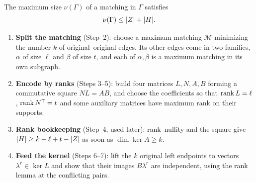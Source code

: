 \begin{lemma}\label{lem:matching}
The maximum size $\nu(\Gamma)$ of a matching in $\Gamma$ satisfies
\[
 \nu(\Gamma)\le \lvert Z\rvert+\lvert H\rvert .
\]
\end{lemma}


\begin{planbox}
\begin{enumerate}[leftmargin=1.3em,itemsep=1pt,topsep=1pt]
\item \textbf{Split the matching} (Step~2): choose a maximum matching $\mathcal M$ minimizing the
 number $k$ of original--original edges. Its other edges come in two families, $\alpha$ of size
 $\ell$ and $\beta$ of size $t$, and each of $\alpha,\beta$ is a maximum matching in its own
 subgraph.
\item \textbf{Encode by ranks} (Steps 3--5): build four matrices $L,N,A,B$ forming a commutative
 square $NL=AB$, and choose the coefficients so that $\operatorname{rank} L=\ell$, $\operatorname{rank} N^{\mathsf T}=t$ and
 some auxiliary matrices have maximum rank on their supports.
\item \textbf{Rank bookkeeping} (Step~4, used later): rank--nullity and the square give
 $\lvert H\rvert\ge k+\ell+t-\lvert Z\rvert$ as soon as $\dim\ker A\ge k$.
\item \textbf{Feed the kernel} (Steps 6--7): lift the $k$ original left endpoints to vectors
 $\lambda^r\in\ker L$ and show that their images $B\lambda^r$ are independent, using the rank lemma
 at the conflicting pairs.
\end{enumerate}
\end{planbox}

